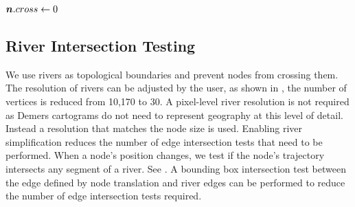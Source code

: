 \begin{algorithm}[tb!]
\begin{algorithmic}[1]
                            \Else

                                \State {}
                                \State $ \bm{n}.cross \gets 0 $ 

                            \EndIf
                            
                        \EndIf

                    \EndIf

                \EndFor
        \State {}
        \EndProcedure
    \end{algorithmic}
\end{algorithm}

\color{black}



\subsection{River Intersection Testing}

We use rivers as topological boundaries and prevent nodes from crossing them. The resolution of rivers can be adjusted by the user, as shown in , the number of vertices is reduced from 10,170 to 30. A pixel-level river resolution is not required as Demers cartograms do not need to represent geography at this level of detail. Instead a resolution that matches the node size is used. Enabling river simplification reduces the number of edge intersection tests that need to be performed. When a node's position changes, we test if the node's trajectory intersects any segment of a river. See . A bounding box intersection test between the edge defined by node translation and river edges can be performed to reduce the number of edge intersection tests required.


